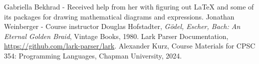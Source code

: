 \documentclass{article}
\theoremstyle{theorem}
\theoremstyle{definition}
\theoremstyle{remark}
\begin{document}
\begin{thebibliography}{99}
 Gabriella Bekhrad - Received help from her with figuring out LaTeX and some of its packages for drawing mathematical diagrams and expressions.
 Jonathan Weinberger - Course instructor
 Douglas Hofstadter, \emph{Gödel, Escher, Bach: An Eternal Golden Braid}, Vintage Books, 1980.
 Lark Parser Documentation, \href{https://github.com/lark-parser/lark}{https://github.com/lark-parser/lark}.
 Alexander Kurz, Course Materials for CPSC 354: Programming Languages, Chapman University, 2024.
\end{thebibliography}
\end{document}
